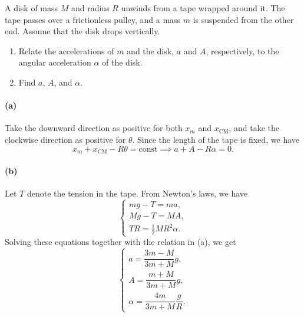 \documentclass{article}
\begin{document}
\Needspace{8cm}
\begin{problem}
A disk of mass $M$ and radius $R$ unwinds from a tape wrapped around it. The tape passes over a frictionless pulley, and a mass $m$ is suspended from the other end. Assume that the disk drops vertically.
\begin{enumerate}
  \item[(a)] Relate the accelerations of $m$ and the disk, $a$ and $A$, respectively, to the angular acceleration $\alpha$ of the disk.
  \item[(b)] Find $a$, $A$, and $\alpha$.
\end{enumerate}
\begin{center}
  \resizebox{!}{4.1cm}{}
\end{center}
\end{problem}

\begin{solution}
	\paragraph{(a)} Take the downward direction as positive for both $x_m$ and $x_{\mathrm{CM}}$, and take the clockwise direction as positive for $\theta$. Since the length of the tape is fixed, we have
	\[ x_m + x_{\mathrm{CM}} - R\theta = \mathrm{const} \implies a + A - R\alpha = 0. \]

	\paragraph{(b)} Let $T$ denote the tension in the tape. From Newton's laws, we have
	\[
		\begin{cases}
			mg - T = ma, \\
			Mg - T = MA, \\
			TR = \frac{1}{2}MR^2\alpha.
		\end{cases}
	\]
	Solving these equations together with the relation in (a), we get
	\[
		\begin{cases}
			a = \dfrac{3m - M}{3m + M}g, \\[7pt]
			A = \dfrac{m + M}{3m + M}g, \\[7pt]
			\alpha = \dfrac{4m}{3m + M}\dfrac{g}{R}.
		\end{cases}
	\]
\end{solution}
\end{document}

